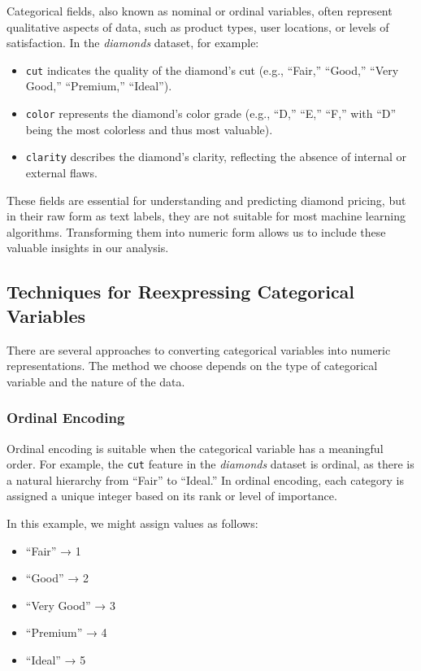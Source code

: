 \documentclass[
  11pt,
]{book}
\newcommand{\passthrough}[1]{#1}
\providecommand{\tightlist}{%
  \setlength{\itemsep}{0pt}\setlength{\parskip}{0pt}}
\theoremstyle{definition}
\theoremstyle{definition}
\theoremstyle{definition}
\theoremstyle{definition}
\theoremstyle{remark}
\begin{document}
Categorical fields, also known as nominal or ordinal variables, often represent qualitative aspects of data, such as product types, user locations, or levels of satisfaction. In the \emph{diamonds} dataset, for example:

\begin{itemize}
\tightlist
\item
  \passthrough{\lstinline!cut!} indicates the quality of the diamond's cut (e.g., ``Fair,'' ``Good,'' ``Very Good,'' ``Premium,'' ``Ideal'').
\item
  \passthrough{\lstinline!color!} represents the diamond's color grade (e.g., ``D,'' ``E,'' ``F,'' with ``D'' being the most colorless and thus most valuable).
\item
  \passthrough{\lstinline!clarity!} describes the diamond's clarity, reflecting the absence of internal or external flaws.
\end{itemize}

These fields are essential for understanding and predicting diamond pricing, but in their raw form as text labels, they are not suitable for most machine learning algorithms. Transforming them into numeric form allows us to include these valuable insights in our analysis.

\subsection{Techniques for Reexpressing Categorical Variables}\label{techniques-for-reexpressing-categorical-variables}

There are several approaches to converting categorical variables into numeric representations. The method we choose depends on the type of categorical variable and the nature of the data.

\subsubsection*{Ordinal Encoding}\label{ordinal-encoding}


Ordinal encoding is suitable when the categorical variable has a meaningful order. For example, the \passthrough{\lstinline!cut!} feature in the \emph{diamonds} dataset is ordinal, as there is a natural hierarchy from ``Fair'' to ``Ideal.'' In ordinal encoding, each category is assigned a unique integer based on its rank or level of importance.

In this example, we might assign values as follows:

\begin{itemize}
\tightlist
\item
  ``Fair'' → 1
\item
  ``Good'' → 2
\item
  ``Very Good'' → 3
\item
  ``Premium'' → 4
\item
  ``Ideal'' → 5
\end{itemize}
\end{document}
